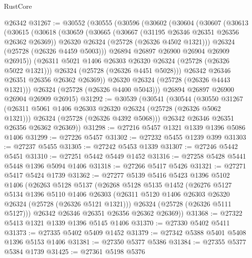\begin{lexlean}{RustCore}
\begin{coremodule}
    @26342
@31267 := @30552
    (@30555
      (@30596
        (@30602
          (@30604
            (@30607
              (@30613
                (@30615
                  (@30618
                    (@30659
                      (@30665
                        (@30667 (@31195 @26346 @26351 @26356 @26362 @26369))
                        @26320
                        @26324
                        (@25728 (@26326 @4502 @1321)))
                      @26324
                      (@25728 (@26326 @4459 @5003)))
                    @26894
                    @26897
                    @26900
                    @26904
                    @26909
                    @26915))
                (@26311 @5021 @1406 @26303 @26320 @26324 (@25728 (@26326 @5022 @1321)))
                @26324
                (@25728 (@26326 @4451 @5028)))
              @26342
              @26346
              @26351
              @26356
              @26362
              @26369))
          @26320
          @26324
          (@25728 (@26326 @4443 @1321)))
        @26324
        (@25728 (@26326 @4400 @5043)))
      @26894
      @26897
      @26900
      @26904
      @26909
      @26915)
@31292 := @30539
    (@30541
      (@30544
        (@30550
          @31267
          (@26311 @5061 @1406 @26303 @26320 @26324 (@25728 (@26326 @5062 @1321)))
          @26324
          (@25728 (@26326 @4392 @5068)))
        @26342
        @26346
        @26351
        @26356
        @26362
        @26369))
@31298 := @27216 @5457 @1321 @1339 @1396 @5086 @1406
@31299 := @27226 @5457
@31302 := @27232 @5455 @1239 @399
@31303 := @27237 @5455
@31305 := @27242 @5453 @1339
@31307 := @27246 @5442 @5451
@31310 := @27251 @5442 @5449 @1452
@31316 := @27258 @5428 @5441 @5448 @1396 @5094 @1406
@31318 := @27266 @5417 @5426
@31321 := @27271 @5417 @5424 @1739
@31362 := @27277
    @5139
    @5416
    @5423
    @1396
    @5102
    @1406
    (@26263
      @5128
      @5137
      (@26268
        @5128
        @5135
        @1452
        (@26276
          @5127
          @5134
          @1396
          @5110
          @1406
          @26303
          (@26311 @5120 @1406 @26303 @26320 @26324 (@25728 (@26326 @5121 @1321)))
          @26324
          (@25728 (@26326 @5111 @5127)))
        @26342
        @26346
        @26351
        @26356
        @26362
        @26369))
@31368 := @27322 @5413 @1321 @1339 @1396 @5145 @1406
@31370 := @27330 @5402 @5411
@31373 := @27335 @5402 @5409 @1452
@31379 := @27342 @5388 @5401 @5408 @1396 @5153 @1406
@31381 := @27350 @5377 @5386
@31384 := @27355 @5377 @5384 @1739
@31425 := @27361
    @5198
    @5376

\end{coremodule}
\end{lexlean}
